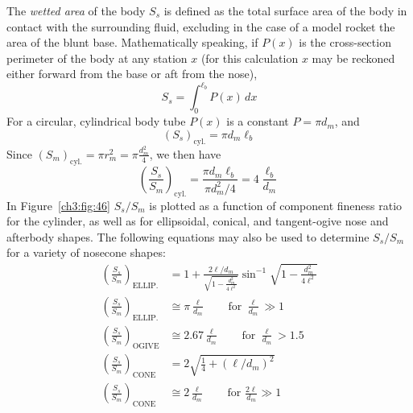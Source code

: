 The \emph{wetted area} of the body $S_s$ is defined as the total surface area
of the body in contact with the surrounding fluid, excluding in the case of a
model rocket the area of the blunt base. Mathematically speaking, if $P(x)$ is
the cross-section perimeter of the body at any station $x$ (for this
calculation $x$ may be reckoned either forward from the base or aft from the
nose),
\begin{equation}\label{ch3:eq:168}
S_s = \int_{0}^{\ell_b} P(x)\,dx
\end{equation}
For a circular, cylindrical body tube $P(x)$ is a constant $P = \pi d_m$, and
\begin{equation}\label{ch3:eq:169}
(S_s)_{\mathrm{cyl.}} = \pi d_m\ell_b
\end{equation}
Since $(S_m)_{\mathrm{cyl.}} = \pi r_m^2 = \pi\frac{d_m^2}{4}$, we then have
\begin{equation}\label{ch3:eq:170}
\left(\frac{S_s}{S_m}\right)_{\mathrm{cyl.}} = \frac{\pi d_m\ell_b}{\pi d_m^2/4}
  = 4\frac{\ell_b}{d_m}
\end{equation}
In Figure~\ref{ch3:fig:46} $S_s/S_m$ is plotted as a function of component
fineness ratio for the cylinder, as well as for ellipsoidal, conical, and
tangent-ogive nose and afterbody shapes. The following equations may also be
used to determine $S_s/S_m$ for a variety of nosecone shapes:
\begin{subequations}\label{ch3:eq:171}
\begin{align}
\left(\frac{S_s}{S_m}\right)_{\mathrm{ELLIP.}} &= 1
  + \frac{2\ell/d_m}{\sqrt{1 - \frac{d_m^2}{4\ell^2}}}
  \sin^{-1}\sqrt{1 - \frac{d_m^2}{4\ell^2}} \label{ch3:eq:171a}\\
\left(\frac{S_s}{S_m}\right)_{\mathrm{ELLIP.}} &\cong
  \pi\frac{\ell}{d_m}
  \qquad \text{for } \frac{\ell}{d_m} \gg 1 \label{ch3:eq:171b}\\
\left(\frac{S_s}{S_m}\right)_{\mathrm{OGIVE}} &\cong 2.67\frac{\ell}{d_m}
  \qquad \text{for } \frac{\ell}{d_m} > 1.5 \label{ch3:eq:171c}\\
\left(\frac{S_s}{S_m}\right)_{\mathrm{CONE}} &=
  2\sqrt{\tfrac{1}{4} + (\ell/d_m)^2} \label{ch3:eq:171d}\\
\left(\frac{S_s}{S_m}\right)_{\mathrm{CONE}} &\cong 2\frac{\ell}{d_m}
  \qquad \text{for } \frac{2\ell}{d_m} \gg 1 \label{ch3:eq:171e}
\end{align}
\end{subequations}

